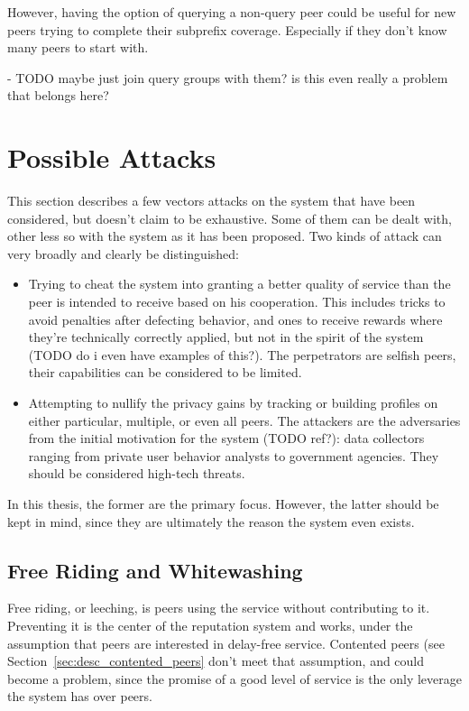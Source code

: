 However, having the option of querying a non-query peer could be useful for new
peers trying to complete their subprefix coverage. Especially if they don't know
many peers to start with.

- TODO maybe just join query groups with them? is this even really a problem
  that belongs here?

\section{Possible Attacks}
This section describes a few vectors attacks on the system that have been
considered, but doesn't claim to be exhaustive. Some of them can be dealt with,
other less so with the system as it has been proposed. Two kinds of attack can
very broadly and clearly be distinguished:
\begin{itemize}
\item Trying to cheat the system into granting a better quality of service than
the peer is intended to receive based on his cooperation. This includes tricks
to avoid penalties after defecting behavior, and ones to receive rewards where
they're technically correctly applied, but not in the spirit of the system (TODO
do i even have examples of this?). The perpetrators are selfish peers, their
capabilities can be considered to be limited.
\item Attempting to nullify the privacy gains by tracking or building profiles
on either particular, multiple, or even all peers. The attackers are the
adversaries from the initial motivation for the system (TODO ref?): data
collectors ranging from private user behavior analysts to government agencies.
They should be considered high-tech threats.
\end{itemize}

In this thesis, the former are the primary focus. However, the latter should be
kept in mind, since they are ultimately the reason the system even exists.

\subsection{Free Riding and Whitewashing}
Free riding, or leeching, is peers using the service without contributing to it.
Preventing it is the center of the reputation system and works, under the
assumption that peers are interested in delay-free service. Contented peers (see
Section~\ref{sec:desc_contented_peers} don't meet that assumption, and could
become a problem, since the promise of a good level of service is the only
leverage the system has over peers.

